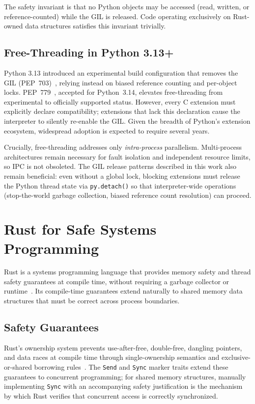 The safety invariant is that no Python objects may be accessed (read, written, or reference-counted) while the GIL is released. Code operating exclusively on Rust-owned data structures satisfies this invariant trivially.

\subsection{Free-Threading in Python 3.13+}

Python 3.13 introduced an experimental build configuration that removes the GIL (PEP~703)~\cite{pep703}, relying instead on biased reference counting and per-object locks. PEP~779~\cite{pep779}, accepted for Python~3.14, elevates free-threading from experimental to officially supported status. However, every C extension must explicitly declare compatibility; extensions that lack this declaration cause the interpreter to silently re-enable the GIL. Given the breadth of Python's extension ecosystem, widespread adoption is expected to require several years.

Crucially, free-threading addresses only \textit{intra-process} parallelism. Multi-process architectures remain necessary for fault isolation and independent resource limits, so IPC is not obsoleted. The GIL release patterns described in this work also remain beneficial: even without a global lock, blocking extensions must release the Python thread state via \texttt{py.detach()} so that interpreter-wide operations (stop-the-world garbage collection, biased reference count resolution) can proceed.

\section{Rust for Safe Systems Programming}
\label{sec:rust}

Rust is a systems programming language that provides memory safety and thread safety guarantees at compile time, without requiring a garbage collector or runtime~\cite{rustbook}. Its compile-time guarantees extend naturally to shared memory data structures that must be correct across process boundaries.

\subsection{Safety Guarantees}

Rust's ownership system prevents use-after-free, double-free, dangling pointers, and data races at compile time through single-ownership semantics and exclusive-or-shared borrowing rules~\cite{rustbook}. The \texttt{Send} and \texttt{Sync} marker traits extend these guarantees to concurrent programming; for shared memory structures, manually implementing \texttt{Sync} with an accompanying safety justification is the mechanism by which Rust verifies that concurrent access is correctly synchronized.


